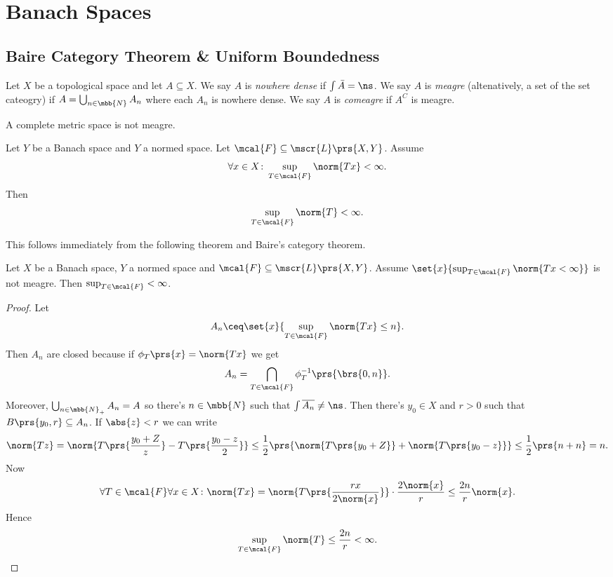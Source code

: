\documentclass[10pt, twoside]{book}
\begin{document}
\section{Banach Spaces}

\subsection{Baire Category Theorem \& Uniform Boundedness}

\begin{definition}
Let $X$ be a topological space and let $A \subseteq X$.
We say $A$ is \emph{nowhere dense} if $\int \bar{A} = \ns$.
We say $A$ is \emph{meagre} (altenatively, a set of the set cateogry) if $A = \bigcup_{n \in \mbb{N}} A_n$ where each $A_n$ is nowhere dense.
We say $A$ is \emph{comeagre} if $A^C$ is meagre.
\end{definition}

\begin{theorem}[Baire]
A complete metric space is not meagre.
\end{theorem}

\begin{theorem}
Let $Y$ be a Banach space and $Y$ a normed space. Let $\mcal{F} \subseteq \mscr{L}\prs{X,Y}$.
Assume
\[\forall x \in X \colon \sup_{T \in \mcal{F}} \norm{Tx} < \infty \text{.}\]
Then
\[\sup_{T \in \mcal{F}} \norm{T} < \infty \text{.}\]
\end{theorem}

This follows immediately from the following theorem and Baire's category theorem.

\begin{theorem}
Let $X$ be a Banach space, $Y$ a normed space and $\mcal{F} \subseteq \mscr{L}\prs{X,Y}$. Assume $\set{x}{\sup_{T \in \mcal{F}} \norm{{T x} < \infty}}$ is not meagre. Then $\sup_{T \in \mcal{F}} < \infty$.
\end{theorem}

\begin{proof}
Let
\[A_n \ceq \set{x}{\sup_{T \in \mcal{F}} \norm{Tx} \leq n} \text{.}\]
Then $A_n$ are closed because if $\phi_T\prs{x} = \norm{Tx}$ we get \[A_n = \bigcap_{T \in \mcal{F}} \phi_T^{-1} \prs{\brs{0,n}} \text{.}\]
Moreover, $\bigcup_{n \in \mbb{N}_+} A_n = A$ so there's $n \in \mbb{N}$ such that $\int \overline{A_n} \neq \ns$. Then there's $y_0 \in X$ and $r > 0$ such that $B\prs{y_0, r} \subseteq A_n$.
If $\abs{z} < r$ we can write
\[\norm{Tz} = \norm{T \prs{\frac{y_0 + Z}{z}} - T \prs{\frac{y_0 - z}{2}}} \leq \frac{1}{2} \prs{\norm{T \prs{y_0 + Z}} + \norm{T \prs{y_0 - z}}} \leq \frac{1}{2} \prs{n+n} = n \text{.}\]
Now
\[\forall T \in \mcal{F} \forall x \in X \colon \norm{Tx} = \norm{T \prs{\frac{r x}{2 \norm{x}}}} \cdot \frac{2 \norm{x}}{r} \leq \frac{2n}{r} \norm{x} \text{.}\]
Hence
\[\sup_{T \in \mcal{F}} \norm{T} \leq \frac{2n}{r} < \infty \text{.}\]
\end{proof}
\end{document}
